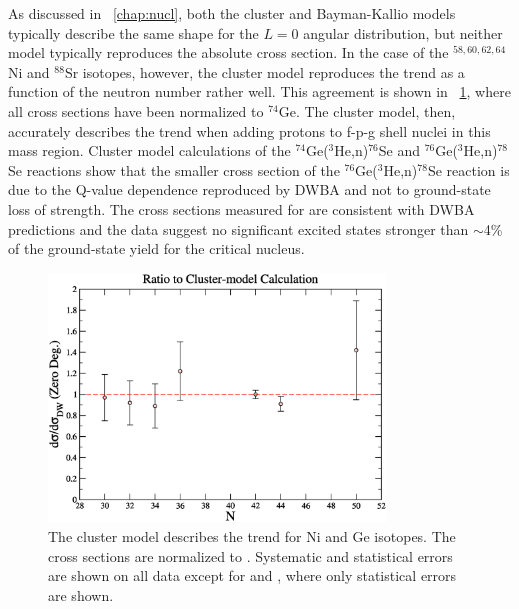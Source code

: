 As discussed in {\chap}~\ref{chap:nucl}, both the cluster and Bayman-Kallio models typically describe the same shape for the $L=0$ angular distribution, but neither model typically reproduces the absolute cross section.  In the case of the $^{58,60,62,64}$Ni and $^{88}$Sr isotopes, however, the cluster model reproduces the trend as a function of the neutron number rather well.  This agreement is shown in {\fig}~\ref{fig:nickelTrend}, where all cross sections have been normalized to $^{74}$Ge.  The cluster model, then, accurately describes the trend when adding protons to f-p-g shell nuclei in this mass region.  Cluster model calculations of the $^{74}$Ge($^3$He,n)$^{76}$Se and $^{76}$Ge($^3$He,n)$^{78}$Se reactions show that the smaller cross section of the $^{76}$Ge($^3$He,n)$^{78}$Se reaction is due to the Q-value dependence reproduced by DWBA and not to ground-state loss of \zp strength.   The cross sections measured for \reaction are consistent with DWBA predictions and the data suggest no significant excited \zp states stronger than $\sim$4\% of the ground-state yield for the critical  nucleus.
\begin{figure}[!htbp]
\centering
\includegraphics[width=0.8\textwidth]{figures/SigmaNormVsN.eps}
\caption[Deviation from the best DWBA fit for other $f-p-g$ isotopes.]{The cluster model describes the trend for Ni and Ge isotopes.  The cross sections are normalized to .  Systematic and statistical errors are shown on all data except for  and , where only statistical errors are shown.}
\label{fig:nickelTrend}
\end{figure}

%
% 
% 
